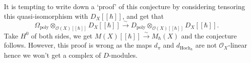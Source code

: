 \documentclass[draft]{article}
\theoremstyle{definition}
\newcommand{\doubleh}{[\![ \hbar ]\!]}
\begin{document}
It is tempting to write down a `proof' of this conjecture by considering tensoring this quasi-isomorphism with $D_X\doubleh$, and get that $$\Omega_{\text{poly}}\otimes_{\mathcal{O}(X)\doubleh}D_X\doubleh\xrightarrow{\sim}D_{\text{poly}}\otimes_{{\mathcal{O}(X)\doubleh}}D_X\doubleh.$$ Take $H^0$ of both sides, we get $M(X)\doubleh\xrightarrow{\sim}M_\hbar(X)$ and the conjecture follows. However, this proof is wrong as the maps $d_\pi$ and $d_{\text{Hoch}_\hbar}$ are not $\mathcal{O}_X$-linear hence we won't get a complex of $D$-modules.

{\footnotesize
}
\end{document}
